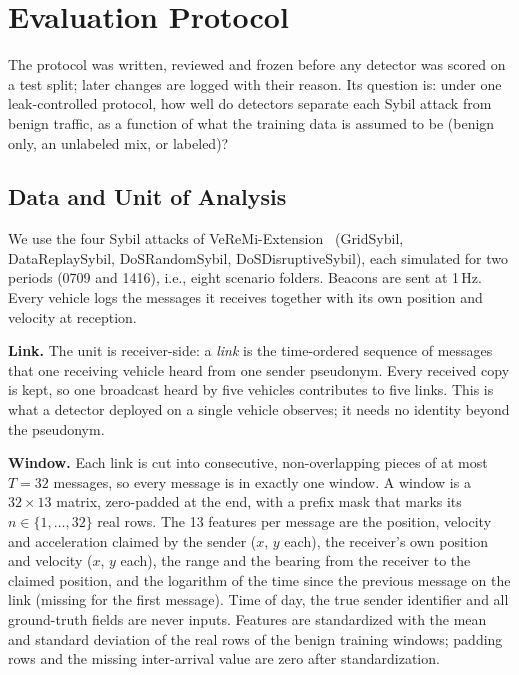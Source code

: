 \section{Evaluation Protocol}\label{sec:protocol}

The protocol was written, reviewed and frozen before any detector was scored on a test split; later changes are
logged with their reason. Its question is: under one leak-controlled protocol, how well do detectors separate
each Sybil attack from benign traffic, as a function of what the training data is assumed to be (benign only,
an unlabeled mix, or labeled)?

\subsection{Data and Unit of Analysis}\label{sec:data}

We use the four Sybil attacks of VeReMi-Extension~\cite{kamel2020veremi} (GridSybil, DataReplaySybil,
DoSRandomSybil, DoSDisruptiveSybil), each simulated for two periods (0709 and 1416), i.e., eight scenario
folders. Beacons are sent at 1\,Hz. Every vehicle logs the messages it receives together with its own position
and velocity at reception.

\textbf{Link.} The unit is receiver-side: a \emph{link} is the time-ordered sequence of messages that one
receiving vehicle heard from one sender pseudonym. Every received copy is kept, so one broadcast heard by five
vehicles contributes to five links. This is what a detector deployed on a single vehicle observes; it needs no
identity beyond the pseudonym.

\textbf{Window.} Each link is cut into consecutive, non-overlapping pieces of at most $T=32$ messages, so every
message is in exactly one window. A window is a $32\times13$ matrix, zero-padded at the end, with a prefix mask
that marks its $n\in\{1,\dots,32\}$ real rows. The 13 features per message are the position, velocity and
acceleration claimed by the sender ($x$, $y$ each), the receiver's own position and velocity ($x$, $y$ each), the
range and the bearing from the receiver to the claimed position, and the logarithm of the time since the previous
message on the link (missing for the first message). Time of day, the true sender identifier and all ground-truth
fields are never inputs. Features are standardized with the mean and standard deviation of the real rows of the
benign training windows; padding rows and the missing inter-arrival value are zero after standardization.

